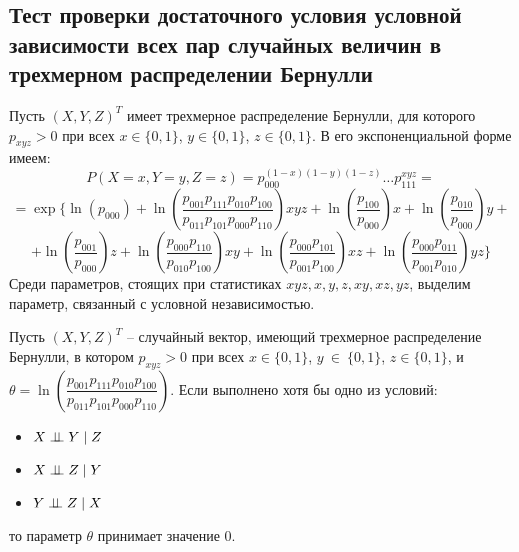 \subsection{Тест проверки 
достаточного условия условной зависимости
всех пар случайных величин в трехмерном распределении
Бернулли}\label{expon_form_section}
Пусть
 $(X,Y,Z)^T$ имеет трехмерное распределение Бернулли, для которого
$p_{xyz}>0$ при всех
$x \in \{0,1\}$, $y\in \{0,1\}$, $z\in \{0,1\}$.
В его экспоненциальной форме имеем:
$$
    P(X=x,Y=y,Z=z) = p_{000}^{(1-x)(1-y)(1-z)} \ldots p_{111}^{x y z} =
$$
$$
    =
        \exp \Biggl\{\ln(p_{000}) +   \ln  \left(\dfrac{p_{001}p_{111}p_{010}p_{100}}{p_{011}p_{101}p_{000}p_{110}}\right)  xyz
     +   \ln\left(\dfrac{p_{100}}{p_{000}}\right) x +   \ln\left(\dfrac{p_{010}}{p_{000}}\right) y + $$
    $$    
    +  \ln\left(\dfrac{p_{001}}{p_{000}}\right) z
        +  \ln \left(\dfrac{p_{000}p_{110}}{p_{010}p_{100}}\right) xy +
         \ln \left(\dfrac{p_{000}p_{101}}{p_{001}p_{100}}\right) xz +
         \ln \left(\dfrac{p_{000}p_{011}}{p_{001}p_{010}}\right) yz \Biggr\}
    $$
Среди параметров, стоящих при статистиках $xyz,x,y,z,xy,xz,yz$, выделим параметр, связанный с условной независимостью.
\begin{theorem}
    Пусть $(X,Y,Z)^T$ -- случайный вектор, имеющий трехмерное распределение Бернулли, 
    в котором $p_{xyz}>0$ при всех
    $x \in \{0,1\}$, $y~\in~\{0,1\}$, $z\in \{0,1\}$, и 
    $\theta = \ln  \left(\dfrac{p_{001}p_{111}p_{010}p_{100}}{p_{011}p_{101}p_{000}p_{110}}\right)$.
    Если выполнено хотя бы одно из условий:
    \begin{itemize}
        \item $X \perp\!\!\!\perp Y \mid Z$
        \item $X \perp\!\!\!\perp Z \mid Y$
        \item $Y \perp\!\!\!\perp Z \mid X$
    \end{itemize}
    то параметр $\theta$ принимает значение $0$.
    \end{theorem}
    
